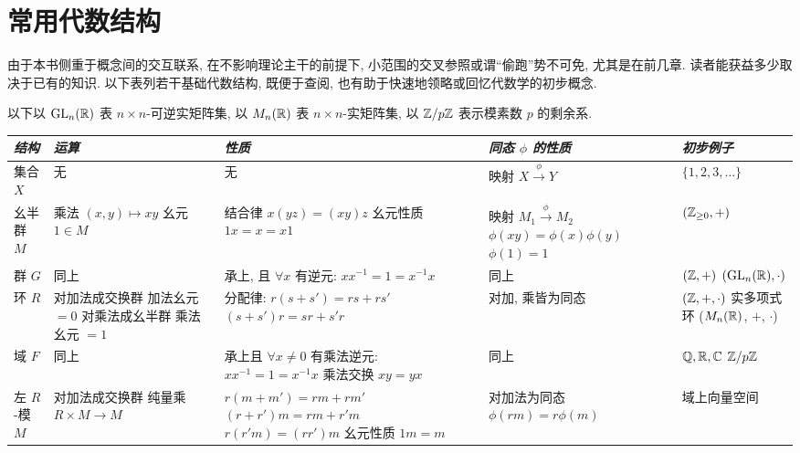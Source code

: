 \section*{常用代数结构}
由于本书侧重于概念间的交互联系, 在不影响理论主干的前提下, 小范围的交叉参照或谓``偷跑''势不可免, 尤其是在前几章. 读者能获益多少取决于已有的知识. 以下表列若干基础代数结构, 既便于查阅, 也有助于快速地领略或回忆代数学的初步概念.

以下以 $\operatorname{GL}_n(\mathbb{R})$ 表 $n \times n$-可逆实矩阵集, 以 $M_n(\mathbb{R})$ 表 $n \times n$-实矩阵集, 以 $\mathbb{Z}/p\mathbb{Z}$ 表示模素数 $p$ 的剩余系.
\begin{center}\scriptsize\begin{tabular}{|l|l|l|l|l|} \hline
	\emph{结构} & \emph{运算} & \emph{性质} & \emph{同态 $\phi$ 的性质} & \emph{初步例子} \\ \hline
	集合 $X$ & 无 & 无 & 映射 $X \xrightarrow{\phi} Y$ & $\{1,2,3, \ldots\}$ \\ \hline
	幺半群 $M$ & \makecell[l]{乘法 $(x,y) \mapsto xy$ \\ 幺元 $1 \in M$} & \makecell[l]{结合律 $x(yz)=(xy)z$ \\ 幺元性质 $1x = x = x1$} & \makecell[l]{映射 $M_1 \xrightarrow{\phi} M_2$ \\ $\phi(xy)=\phi(x)\phi(y)$ \\ $\phi(1)=1$} & $(\mathbb{Z}_{\geq 0}, +)$ \\ \hline
	群 $G$ & 同上 & \makecell[l]{承上, 且 $\forall x$ 有逆元: \\ $xx^{-1} = 1 = x^{-1} x$} & 同上 & \makecell[l]{$(\mathbb{Z}, +)$ \\ $(\operatorname{GL}_n(\mathbb{R}), \cdot)$ } \\ \hline
	环 $R$ & \makecell[l]{对加法成交换群 \\ 加法幺元 $= 0$ \\ 对乘法成幺半群 \\ 乘法幺元 $= 1$ } & \makecell[l]{分配律: \\ $r(s+s') = rs+rs'$ \\ $(s+s')r = sr + s'r$ \\ } & 对加, 乘皆为同态 & \makecell[l]{$(\mathbb{Z}, +, \cdot)$ \\ 实多项式环 \\ ($M_n(\mathbb{R})$, $+$, $\cdot$)} \\ \hline
	域 $F$ & 同上 & \makecell[l]{承上且 $\forall x \neq 0$ 有乘法逆元: \\ $xx^{-1}=1=x^{-1}x$ \\ 乘法交换 $xy=yx$} & 同上 & \makecell[l]{$\mathbb{Q}, \mathbb{R}, \mathbb{C}$ \\ $\mathbb{Z}/p\mathbb{Z}$} \\ \hline
	左 $R$-模 $M$ & \makecell[l]{对加法成交换群 \\ 纯量乘 $R \times M \to M$} & \makecell[l]{$r(m + m') = rm + rm'$ \\ $(r+r')m = rm + r'm$ \\ $r(r'm) = (rr')m$ \\ 幺元性质 $1 m = m$ } & \makecell[l]{对加法为同态 \\ $\phi(rm) = r\phi(m)$ } & 域上向量空间  \\ \hline
\end{tabular}\end{center}

